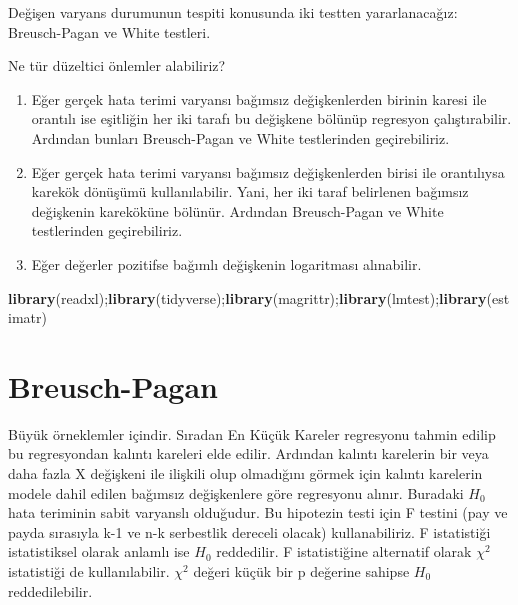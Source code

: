 \documentclass[
]{book}
\newenvironment{Shaded}{\begin{snugshade}}{\end{snugshade}}
\newcommand{\KeywordTok}[1]{\textcolor[rgb]{0.13,0.29,0.53}{\textbf{#1}}}
\newcommand{\NormalTok}[1]{#1}
\newcommand{\OperatorTok}[1]{\textcolor[rgb]{0.81,0.36,0.00}{\textbf{#1}}}
\newcommand{\StringTok}[1]{\textcolor[rgb]{0.31,0.60,0.02}{#1}}
\begin{document}
Değişen varyans durumunun tespiti konusunda iki testten yararlanacağız: Breusch-Pagan ve White testleri.

Ne tür düzeltici önlemler alabiliriz?

\begin{enumerate}
\def\labelenumi{\roman{enumi}.}
\item
  Eğer gerçek hata terimi varyansı bağımsız değişkenlerden birinin karesi ile orantılı ise eşitliğin her iki tarafı bu değişkene bölünüp regresyon çalıştırabilir. Ardından bunları Breusch-Pagan ve White testlerinden geçirebiliriz.
\item
  Eğer gerçek hata terimi varyansı bağımsız değişkenlerden birisi ile orantılıysa karekök dönüşümü kullanılabilir. Yani, her iki taraf belirlenen bağımsız değişkenin kareköküne bölünür. Ardından Breusch-Pagan ve White testlerinden geçirebiliriz.
\item
  Eğer değerler pozitifse bağımlı değişkenin logaritması alınabilir.
\end{enumerate}

\begin{Shaded}
\begin{Highlighting}[]
\KeywordTok{library}\NormalTok{(readxl);}\KeywordTok{library}\NormalTok{(tidyverse);}\KeywordTok{library}\NormalTok{(magrittr);}\KeywordTok{library}\NormalTok{(lmtest);}\KeywordTok{library}\NormalTok{(estimatr)}
\end{Highlighting}
\end{Shaded}

\begin{Shaded}
\end{Shaded}

\hypertarget{breusch-pagan}{%
\section{Breusch-Pagan}\label{breusch-pagan}}

Büyük örneklemler içindir. Sıradan En Küçük Kareler regresyonu tahmin edilip bu regresyondan kalıntı kareleri elde edilir. Ardından kalıntı karelerin bir veya daha fazla X değişkeni ile ilişkili olup olmadığını görmek için kalıntı karelerin modele dahil edilen bağımsız değişkenlere göre regresyonu alınır. Buradaki \(H_0\) hata teriminin sabit varyanslı olduğudur. Bu hipotezin testi için F testini (pay ve payda sırasıyla k-1 ve n-k serbestlik dereceli olacak) kullanabiliriz. F istatistiği istatistiksel olarak anlamlı ise \(H_0\) reddedilir. F istatistiğine alternatif olarak \(\chi^2\) istatistiği de kullanılabilir. \(\chi^2\) değeri küçük bir p değerine sahipse \(H_0\) reddedilebilir.
\end{document}
